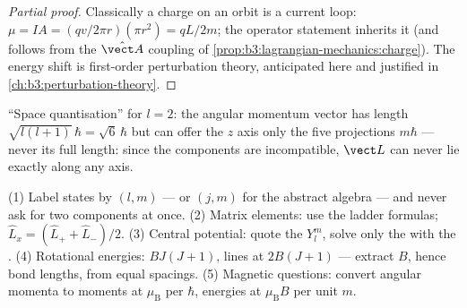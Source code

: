 \begin{proof}[Partial proof]
Classically a charge on an orbit is a current loop: $\mu = IA =
(qv/2\pi r)(\pi r^2) = qL/2m$; the operator statement inherits it
(and follows from the $\hat{\vect A}$ coupling of
\cref{prop:b3:lagrangian-mechanics:charge}). The energy shift is
first-order perturbation theory, anticipated here and justified in
\cref{ch:b3:perturbation-theory}.
\end{proof}

\begin{omfigure}

{\small ``Space quantisation'' for $l = 2$: the angular momentum
vector has length $\sqrt{l(l+1)}\,\hbar = \sqrt6\,\hbar$ but can
offer the $z$ axis only the five projections $m\hbar$ --- never its
full length: since the components are incompatible, $\vect L$ can
never lie exactly along any axis.}
\end{omfigure}

\begin{method}\label{met:b3:quantum-angular-momentum:method}
(1) Label states by $(l, m)$ --- or $(j, m)$ for the abstract
algebra --- and never ask for two components at once. (2) Matrix
elements: use the ladder formulas; $\hat L_x = (\hat L_+ + \hat
L_-)/2$. (3) Central potential: quote the $Y_l^m$, solve only the
 with the . (4) Rotational
energies: $BJ(J+1)$, lines at $2B(J+1)$ --- extract $B$, hence bond
lengths, from equal spacings. (5) Magnetic questions: convert
angular momenta to moments at $\mu_{\text{B}}$ per $\hbar$, energies
at $\mu_{\text{B}}B$ per unit $m$.
\end{method}

